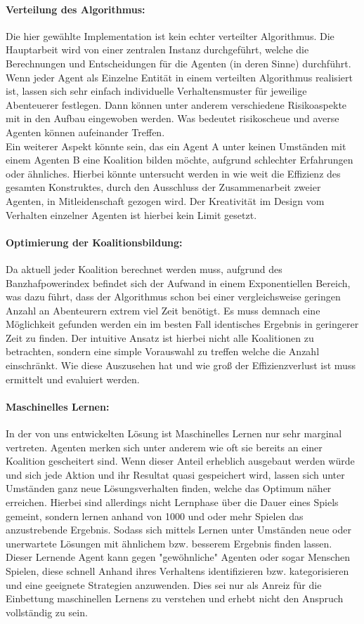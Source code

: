 \documentclass[fleqn,10pt]{article} %
\begin{document}
\paragraph{Verteilung des Algorithmus:}
Die hier gewählte Implementation ist kein echter verteilter Algorithmus. Die Hauptarbeit wird von einer zentralen Instanz durchgeführt, welche die Berechnungen und Entscheidungen für die Agenten (in deren Sinne) durchführt. Wenn jeder Agent als Einzelne Entität in einem verteilten Algorithmus realisiert ist, lassen sich sehr einfach individuelle Verhaltensmuster für jeweilige Abenteuerer festlegen. Dann können unter anderem verschiedene Risikoaspekte mit in den Aufbau eingewoben werden. Was bedeutet risikoscheue und averse Agenten können aufeinander Treffen. \\
Ein weiterer Aspekt könnte sein, das ein Agent A unter keinen Umständen mit einem Agenten B	eine Koalition bilden möchte, aufgrund schlechter Erfahrungen oder ähnliches. Hierbei könnte untersucht werden in wie weit die Effizienz des gesamten Konstruktes, durch den Ausschluss der Zusammenarbeit zweier Agenten, in Mitleidenschaft gezogen wird. Der Kreativität im Design vom Verhalten einzelner Agenten ist hierbei kein Limit gesetzt.

\paragraph{Optimierung der Koalitionsbildung:}
Da aktuell jeder Koalition berechnet werden muss, aufgrund des Banzhafpowerindex befindet sich der Aufwand in einem Exponentiellen Bereich, was dazu führt, dass der Algorithmus schon bei einer vergleichsweise geringen Anzahl an Abenteurern extrem viel Zeit benötigt. Es muss demnach eine Möglichkeit gefunden werden ein im besten Fall identisches Ergebnis in geringerer Zeit zu finden. Der intuitive Ansatz ist hierbei nicht alle Koalitionen zu betrachten, sondern eine simple Vorauswahl zu treffen welche die Anzahl einschränkt. Wie diese Auszusehen hat und wie groß der Effizienzverlust ist muss ermittelt und evaluiert werden.

\paragraph{Maschinelles Lernen:} 
In der von uns entwickelten Lösung ist Maschinelles Lernen nur sehr marginal vertreten. Agenten merken sich unter anderem wie oft sie bereits an einer Koalition gescheitert sind. Wenn dieser Anteil erheblich ausgebaut werden würde und sich jede Aktion und ihr Resultat quasi gespeichert wird, lassen sich unter Umständen ganz neue Lösungsverhalten finden, welche das Optimum näher erreichen. Hierbei sind allerdings nicht Lernphase über die Dauer eines Spiels gemeint, sondern lernen anhand von 1000 und oder mehr Spielen das anzustrebende Ergebnis. Sodass sich mittels Lernen unter Umständen neue oder unerwartete Lösungen mit ähnlichem bzw. besserem Ergebnis finden lassen. Dieser Lernende Agent kann gegen "gewöhnliche" Agenten oder sogar Menschen Spielen, diese schnell Anhand ihres Verhaltens identifizieren bzw. kategorisieren und eine geeignete Strategien anzuwenden. Dies sei nur als Anreiz für die Einbettung maschinellen Lernens zu verstehen und erhebt nicht den Anspruch vollständig zu sein.
\end{document}
